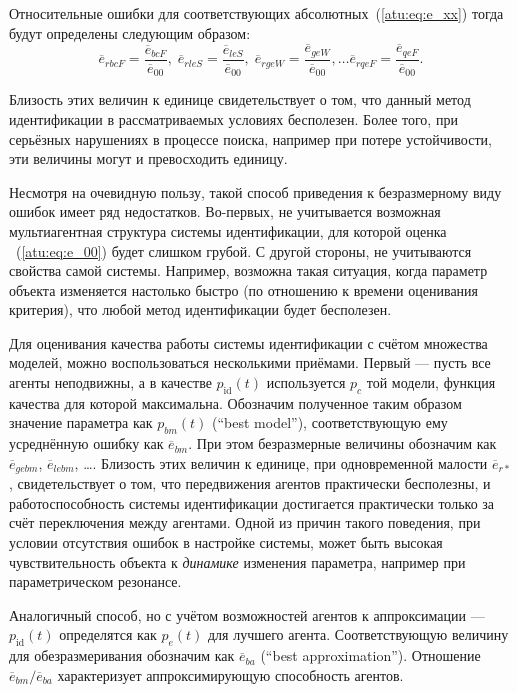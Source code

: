Относительные ошибки для соответствующих абсолютных~(\ref{atu:eq:e_xx})
тогда будут определены следующим образом:
%
\begin{equation}
  \overline{e}_{rbcF} = \frac{\overline{e}_{bcF}}{\overline{e}_{00}}, \;
  \overline{e}_{rleS} = \frac{\overline{e}_{leS}}{\overline{e}_{00}}, \;
  \overline{e}_{rgeW} = \frac{\overline{e}_{geW}}{\overline{e}_{00}},
  \ldots
  \overline{e}_{rqeF} = \frac{\overline{e}_{qeF}}{\overline{e}_{00}}.
  \label{atu:eq:e_rxx}
\end{equation}

Близость этих величин к единице свидетельствует о том, что
данный метод идентификации в рассматриваемых условиях бесполезен.
Более того, при серьёзных нарушениях в процессе поиска,
например при потере устойчивости, эти величины могут и превосходить единицу.

Несмотря на очевидную пользу, такой способ приведения к безразмерному виду ошибок
имеет ряд недостатков. Во-первых,
не учитывается возможная мультиагентная структура системы идентификации,
для которой оценка ~(\ref{atu:eq:e_00}) будет слишком грубой.
С другой стороны,
не учитываются свойства
самой системы. Например, возможна такая ситуация, когда параметр
объекта изменяется настолько быстро (по отношению к времени оценивания критерия),
что любой метод идентификации будет бесполезен.

Для оценивания качества работы системы идентификации с счётом
множества моделей, можно воспользоваться несколькими приёмами.
Первый --- пусть все агенты неподвижны, а в качестве $p_\mathrm{id}(t)$
используется $p_c$ той модели, функция качества для которой
максимальна. Обозначим полученное таким образом значение
параметра как $p_{bm}(t)$ (``best model''),
соответствующую ему усреднённую ошибку как $\overline{e}_{bm}$.
При этом безразмерные величины обозначим как
$\overline{e}_{gebm}$, $\overline{e}_{lebm}$,  \ldots.
Близость этих величин к единице, при одновременной малости
$\overline{e}_{r*}$, свидетельствует о том, что передвижения
агентов практически бесполезны, и работоспособность системы идентификации достигается
практически только за счёт переключения между агентами.
Одной из причин такого поведения, при условии отсутствия ошибок
в настройке системы, может быть высокая чувствительность
объекта к \textit{динамике} изменения параметра, например
при параметрическом резонансе.

Аналогичный способ, но с учётом возможностей агентов
к аппроксимации --- $p_\mathrm{id}(t)$ определятся
как $p_e(t)$ для лучшего агента.
Соответствующую величину для обезразмеривания обозначим как
$\overline{e}_{ba}$ (``best approximation'').
Отношение $\overline{e}_{bm} / \overline{e}_{ba}$
характеризует аппроксимирующую способность агентов.

